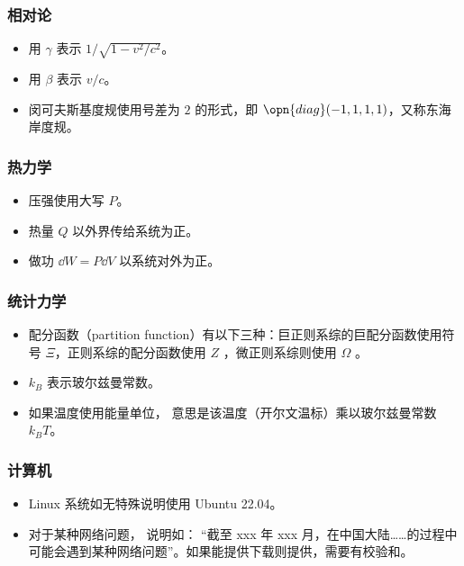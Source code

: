 \subsubsection{相对论}
\begin{itemize}
\item 用 $\gamma$ 表示 $1/\sqrt{1 - v^2/c^2}$。
\item 用 $\beta$ 表示 $v/c$。
\item 闵可夫斯基度规使用号差为 $2$ 的形式，即 $\opn{diag}(-1, 1, 1, 1)$，又称东海岸度规。
\end{itemize}

\subsubsection{热力学}
\begin{itemize}
\item 压强使用大写 $P$。
\item 热量 $Q$ 以外界传给系统为正。
\item 做功 $\dd{W} = P\dd{V}$ 以系统对外为正。
\end{itemize}

\subsubsection{统计力学}
\begin{itemize}
\item 配分函数（partition function）有以下三种：巨正则系综的巨配分函数使用符号 $\Xi$，正则系综的配分函数使用 $Z$ ，微正则系综则使用 $\Omega$ 。
\item $k_B$ 表示玻尔兹曼常数。
\item 如果温度使用能量单位， 意思是该温度（开尔文温标）乘以玻尔兹曼常数 $k_B T$。
\end{itemize}

\subsubsection{计算机}
\begin{itemize}
\item Linux 系统如无特殊说明使用 Ubuntu 22.04。
\item 对于某种网络问题， 说明如： “截至 xxx 年 xxx 月，在中国大陆……的过程中可能会遇到某种网络问题”。如果能提供下载则提供，需要有校验和。
\end{itemize}
